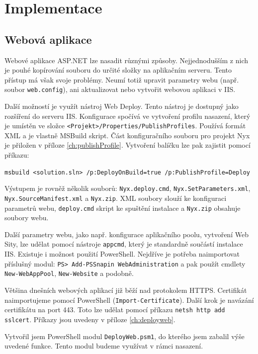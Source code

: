 \section{Implementace}

\subsection{Webová aplikace}
Webové aplikace ASP.NET lze nasadit různými způsoby. Nejjednodušším z nich je pouhé kopírování souboru do určité složky na aplikačním serveru. Tento přístup má však svoje problémy. Neumí totiž upravit parametry webu (např. soubor \texttt{web.config}), ani aktualizovat nebo vytvořit webovou aplikaci v IIS. 

Další možností je využít nástroj Web Deploy. Tento nástroj je dostupný jako rozšíření do serveru IIS. Konfigurace spočívá ve vytvoření profilu nasazení, který je umístěn ve složce \texttt{<Projekt>/Properties/PublishProfiles}. Používá formát XML a je vlastně MSBuild skript. Část konfiguračního souboru pro projekt Nyx je přiložen v příloze \ref{ch:publishProfile}. Vytvoření balíčku lze pak zajistit pomocí příkazu:

\texttt{msbuild <solution.sln> /p:DeployOnBuild=true /p:PublishProfile=Deploy}

Výstupem je rovněž několik souborů: \texttt{Nyx.deploy.cmd}, \texttt{Nyx.SetParameters.xml}, \texttt{Nyx.SourceManifest.xml} a \texttt{Nyx.zip}. XML soubory slouží ke konfiguraci parametrů webu, \texttt{deploy.cmd} skript ke spuštění instalace a \texttt{Nyx.zip} obsahuje soubory webu.

Další parametry webu, jako např. konfigurace aplikačního poolu, vytvoření Web Sity, lze udělat pomocí nástroje \texttt{appcmd}, který je standardně součástí instalace IIS. Existuje i možnost použití PowerShell. Nejdříve je potřeba naimportovat příslušný modul: \texttt{PS> Add-PSSnapin WebAdministration} a pak použít cmdlety \texttt{New-WebAppPool}, \texttt{New-Website} a podobně.

Většina dnešních webových aplikací již běží nad protokolem HTTPS. Certifikát naimportujeme pomocí PowerShell (\texttt{Import-Certificate}). Další krok je navázání certifikátu na port 443. Toto lze udělat pomocí příkazu \texttt{netsh http add sslcert}. Příkazy jsou uvedeny v příloze \ref{ch:deployweb}.

Vytvořil jsem PowerShell modul \texttt{DeployWeb.psm1}, do kterého jsem zabalil výše uvedené funkce. Tento modul budeme využívat v rámci nasazení.

